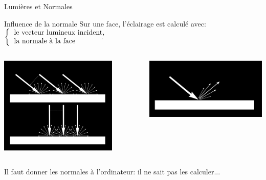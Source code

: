 \documentclass{beamer}
\begin{document}
\begin{frame}{Lumières et Normales}
	\begin{block}{Influence de la normale}
		Sur une face, l'éclairage est calculé avec:
		$
		\left\{
		\begin{tabular}{p{4cm}}
		\text{le vecteur lumineux incident,} \\
		\text{la normale \`a la face}		
		\end{tabular}
		\right.$.
	\end{block}
	\vspace{2mm}
	\begin{columns}
		\begin{column}{0.5\textwidth}
			\centering
			\includegraphics[width=0.8\textwidth]{img/diffuseAngle}
		\end{column}
		\begin{column}{0.5\textwidth}
			\centering
			\includegraphics[width=\textwidth]{img/specular}
		\end{column}
	\end{columns}
	\begin{alertblock}{}
		Il faut donner les normales à l'ordinateur: il ne sait pas les calculer...
	\end{alertblock}
\end{frame}
\end{document}

